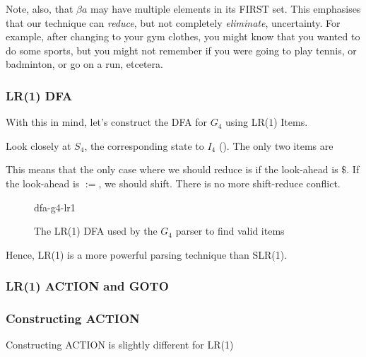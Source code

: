 Note, also, that $\beta a$ may have multiple elements in its FIRST set. This emphasises that our technique can \textit{reduce}, but not completely \textit{eliminate}, uncertainty. For example, after changing to your gym clothes, you might know that you wanted to do some sports, but you might not remember if you were going to play tennis, or badminton, or go on a run, etcetera. 

\subsubsection{LR(1) DFA}
With this in mind, let's construct the DFA for $G_4$ using LR($1$) Items.

Look closely at $S_4$, the corresponding state to $I_4$ (). The only two items are
\begin{center}
\end{center}
This means that the only case where we should reduce is if the look-ahead is $\$$. If the look-ahead is $:=$, we should shift. There is no more shift-reduce conflict.

\begin{figure}
    \centering
    {dfa-g4-lr1}
    \caption{The LR(1) DFA used by the $G_4$ parser to find valid items}
    \label{fig:dfa-g4-lr1}
\end{figure}

Hence, LR(1) is a more powerful parsing technique than SLR(1).

\subsubsection{LR(1) ACTION and GOTO}

\subsubsection{Constructing ACTION}
Constructing ACTION is slightly different for LR(1)

